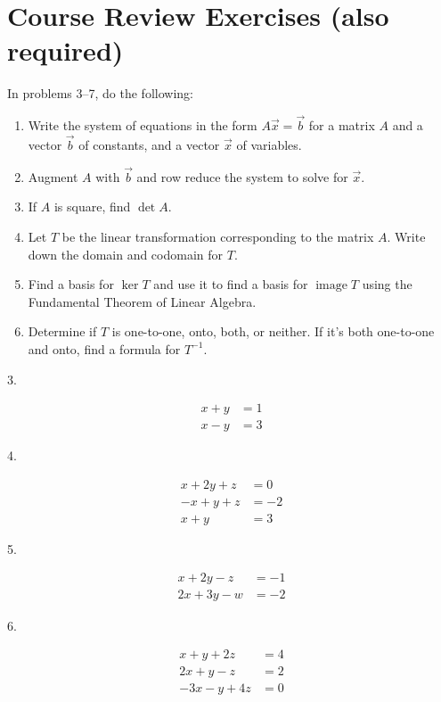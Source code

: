\documentclass{article}
\begin{document}
\section{Course Review Exercises (also required)}

In problems 3--7, do the following:

\begin{enumerate}

	\item Write the system of equations in the form $A\vec{x} = \vec{b}$ for a matrix $A$ and a vector $\vec{b}$ of constants, and a vector $\vec{x}$ of variables.

	\item Augment $A$ with $\vec{b}$ and row reduce the system to solve for $\vec{x}$.

	\item If $A$ is square, find $\det A$.

	\item Let $T$ be the linear transformation corresponding to the matrix $A$. Write down the domain and codomain for $T$.

	\item Find a basis for $\ker T$ and use it to find a basis for $\operatorname{image} T$ using the Fundamental Theorem of Linear Algebra.

	\item Determine if $T$ is one-to-one, onto, both, or neither. If it's both one-to-one and onto, find a formula for $T^{-1}$.

\end{enumerate}

3.

\begin{align*}
	x + y &= 1\\
	x - y &= 3
\end{align*}

4.

\begin{align*}
	x + 2y + z &= 0\\
	-x + y + z &= -2\\
	x + y &= 3
\end{align*}

5.

\begin{align*}
	x + 2y - z &= -1\\
	2x + 3y - w &= -2
\end{align*}

6.

\begin{align*}
	x + y + 2z &= 4\\
	2x + y - z &= 2\\
	-3x - y + 4z &= 0
\end{align*}
\end{document}
